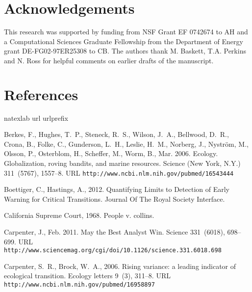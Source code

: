 \documentclass[authoryear,review,12pt]{elsarticle}
\begin{document}
 \section{Acknowledgements}
This research was supported by funding from NSF Grant EF 0742674 to AH
and a Computational Sciences Graduate Fellowship from the Department of
Energy grant DE-FG02-97ER25308 to CB. The authors thank M. Baskett, 
T.A. Perkins and N. Ross for helpful comments on earlier drafts of the
manuscript.  

 \section{References}%

 \begin{thebibliography}{24}
\expandafter\ifx\csname natexlab\endcsname\relax\def\natexlab#1{#1}\fi
\expandafter\ifx\csname url\endcsname\relax
  \def\url#1{\texttt{#1}}\fi
\expandafter\ifx\csname urlprefix\endcsname\relax\def\urlprefix{URL }\fi

Berkes, F., Hughes, T.~P., Steneck, R.~S., Wilson, J.~A., Bellwood, D.~R.,
  Crona, B., Folke, C., Gunderson, L.~H., Leslie, H.~M., Norberg, J.,
  Nystr\"{o}m, M., Olsson, P., Osterblom, H., Scheffer, M., Worm, B., Mar.
  2006. {Ecology. Globalization, roving bandits, and marine resources.} Science
  (New York, N.Y.) 311~(5767), 1557--8.
\newline\urlprefix\url{http://www.ncbi.nlm.nih.gov/pubmed/16543444}

Boettiger, C., Hastings, A., 2012. {Quantifying Limits to Detection of Early
  Warning for Critical Transitions}. Journal Of The Royal Society Interface.

{California Supreme Court}, 1968. People v. collins.

Carpenter, J., Feb. 2011. {May the Best Analyst Win}. Science 331~(6018),
  698--699.
\newline\urlprefix\url{http://www.sciencemag.org/cgi/doi/10.1126/science.331.6018.698}

Carpenter, S.~R., Brock, W.~A., 2006. {Rising variance: a leading indicator of
  ecological transition.} Ecology letters 9~(3), 311--8.
\newline\urlprefix\url{http://www.ncbi.nlm.nih.gov/pubmed/16958897}


\end{thebibliography}
\end{document}
